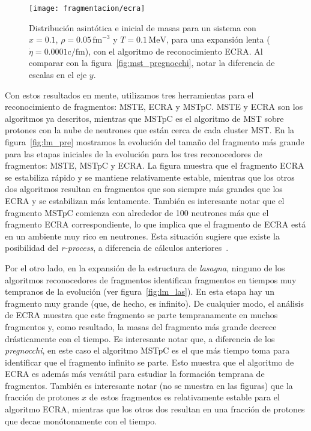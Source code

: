 \begin{figure}
  \texttt{[image: fragmentacion/ecra]}
  \caption{Distribución asintótica e inicial de masas para un sistema con $x = 0.1$, $\rho = 0.05\,\text{fm}^{-3}$ y $T = 0.1\,\text{MeV}$, para una expansión lenta ($\dot{\eta} = 0.0001\text{c/fm}$), con el algoritmo de reconocimiento ECRA. Al comparar con la figura~\ref{fig:mst_pregnocchi}, notar la diferencia de escalas en el eje $y$.}
\label{fig:ecra_pregnocchi}
\end{figure}

Con estos resultados en mente, utilizamos tres herramientas para el reconocimiento de fragmentos: MSTE, ECRA y MSTpC.
MSTE y ECRA son los algoritmos ya descritos, mientras que MSTpC es el algoritmo de MST sobre protones con la nube de neutrones que están cerca de cada cluster MST.\@
En la figura~\ref{fig:lm_pre} mostramos la evolución del tamaño del fragmento más grande para las etapas iniciales de la evolución para los tres reconocedores de fragmentos: MSTE, MSTpC y ECRA.\@
La figura muestra que el fragmento ECRA se estabiliza rápido y se mantiene relativamente estable, mientras que los otros dos algoritmos resultan en fragmentos que son siempre más grandes que los ECRA y se estabilizan más lentamente.
También es interesante notar que el fragmento MSTpC comienza con alrededor de 100 neutrones más que el fragmento ECRA correspondiente, lo que implica que el fragmento de ECRA está en un ambiente muy rico en neutrones.
Esta situación sugiere que existe la posibilidad del \emph{r-process}, a diferencia de cálculos anteriores~\cite{caplan_pasta_2015}.

Por el otro lado, en la expansión de la estructura de \emph{lasagna}, ninguno de los algoritmos reconocedores de fragmentos identifican fragmentos en tiempos muy tempranos de la evolución (ver figura~\ref{fig:lm_las}).
En esta etapa hay un fragmento muy grande (que, de hecho, es infinito).
De cualquier modo, el análisis de ECRA muestra que este fragmento se parte tempranamente en muchos fragmentos y, como resultado, la masas del fragmento más grande decrece drásticamente con el tiempo.
Es interesante notar que, a diferencia de los \emph{pregnocchi}, en este caso el algoritmo MSTpC es el que más tiempo toma para identificar que el fragmento infinito se parte.
Esto muestra que el algoritmo de ECRA es además más versátil para estudiar la formación temprana de fragmentos.
También es interesante notar (no se muestra en las figuras) que la fracción de protones $x$ de estos fragmentos es relativamente estable para el algoritmo ECRA, mientras que los otros dos resultan en una fracción de protones que decae monótonamente con el tiempo.


